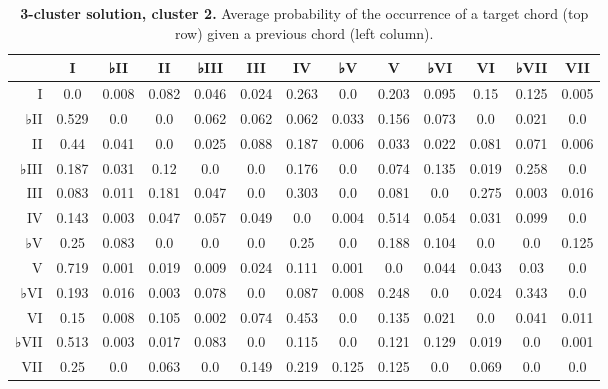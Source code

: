 \begin{table}[htbp]
\begin{minipage}{\linewidth}
\setlength{\tymax}{0.5\linewidth}
\centering
\small
\caption{\textbf{3-cluster solution, cluster 2.} Average probability of the occurrence of a target chord (top row) given a previous chord (left column).}
\label{3-clustersolutioncluster2.averageprobabilityoftheoccurrenceofatargetchordtoprowgivenapreviouschordleftcolumn.}
\begin{tabulary}{\textwidth}{@{}RCCCCCCCCCCCC@{}} \toprule
&I&♭II&II&♭III&III&IV&♭V&V&♭VI&VI&♭VII&VII\\
\midrule
I&0.0&0.008&0.082&0.046&0.024&0.263&0.0&0.203&0.095&0.15&0.125&0.005\\
♭II&0.529&0.0&0.0&0.062&0.062&0.062&0.033&0.156&0.073&0.0&0.021&0.0\\
II&0.44&0.041&0.0&0.025&0.088&0.187&0.006&0.033&0.022&0.081&0.071&0.006\\
♭III&0.187&0.031&0.12&0.0&0.0&0.176&0.0&0.074&0.135&0.019&0.258&0.0\\
III&0.083&0.011&0.181&0.047&0.0&0.303&0.0&0.081&0.0&0.275&0.003&0.016\\
IV&0.143&0.003&0.047&0.057&0.049&0.0&0.004&0.514&0.054&0.031&0.099&0.0\\
♭V&0.25&0.083&0.0&0.0&0.0&0.25&0.0&0.188&0.104&0.0&0.0&0.125\\
V&0.719&0.001&0.019&0.009&0.024&0.111&0.001&0.0&0.044&0.043&0.03&0.0\\
♭VI&0.193&0.016&0.003&0.078&0.0&0.087&0.008&0.248&0.0&0.024&0.343&0.0\\
VI&0.15&0.008&0.105&0.002&0.074&0.453&0.0&0.135&0.021&0.0&0.041&0.011\\
♭VII&0.513&0.003&0.017&0.083&0.0&0.115&0.0&0.121&0.129&0.019&0.0&0.001\\
VII&0.25&0.0&0.063&0.0&0.149&0.219&0.125&0.125&0.0&0.069&0.0&0.0\\

\bottomrule

\end{tabulary}
\end{minipage}
\end{table}

